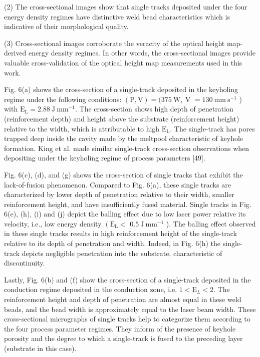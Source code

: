 \documentclass[10pt]{article}
\begin{document}
(2) The cross-sectional images show that single tracks deposited under the four energy density regimes have distinctive weld bead characteristics which is indicative of their morphological quality.

(3) Cross-sectional images corroborate the veracity of the optical height map-derived energy density regimes. In other words, the cross-sectional images provide valuable cross-validation of the optical height map measurements used in this work.

Fig. 6(a) shows the cross-section of a single-track deposited in the keyholing regime under the following conditions: $(\mathrm{P}, \mathrm{V})=(375 \mathrm{~W}, \mathrm{~V}$ $=130 \mathrm{~mm} \mathrm{~s}^{-1}$ ) with $\mathrm{E}_{\mathrm{L}}=2.88 \mathrm{~J} \mathrm{~mm}^{-1}$. The cross-section shows high depth of penetration (reinforcement depth) and height above the substrate (reinforcement height) relative to the width, which is attributable to high $\mathrm{E}_{\mathrm{L}}$. The single-track has pores trapped deep inside the cavity made by the meltpool characteristic of keyhole formation. King et al. made similar single-track cross-section observations when depositing under the keyholing regime of process parameters [49].

Fig. 6(c), (d), and (g) shows the cross-section of single tracks that exhibit the lack-of-fusion phenomenon. Compared to Fig. 6(a), these single tracks are characterized by lower depth of penetration relative to their width, smaller reinforcement height, and have insufficiently fused material. Single tracks in Fig. 6(e), (h), (i) and (j) depict the balling effect due to low laser power relative its velocity, i.e., low energy density $\left(\mathrm{E}_{\mathrm{L}}<\right.$ $0.5 \mathrm{~J} \mathrm{~mm}^{-1}$ ). The balling effect observed in these single tracks results in high reinforcement height of the single-track relative to its depth of penetration and width. Indeed, in Fig. 6(h) the single-track depicts negligible penetration into the substrate, characteristic of discontinuity.

Lastly, Fig. 6(b) and (f) show the cross-section of a single-track deposited in the conduction regime deposited in the conduction zone, i.e. $1<\mathrm{E}_{L}<2$. The reinforcement height and depth of penetration are almost equal in these weld beads, and the bead width is approximately equal to the laser beam width. These cross-sectional micrographs of single tracks help to categorize them according to the four process parameter regimes. They inform of the presence of keyhole porosity and the degree to which a single-track is fused to the preceding layer (substrate in this case).
\end{document}
